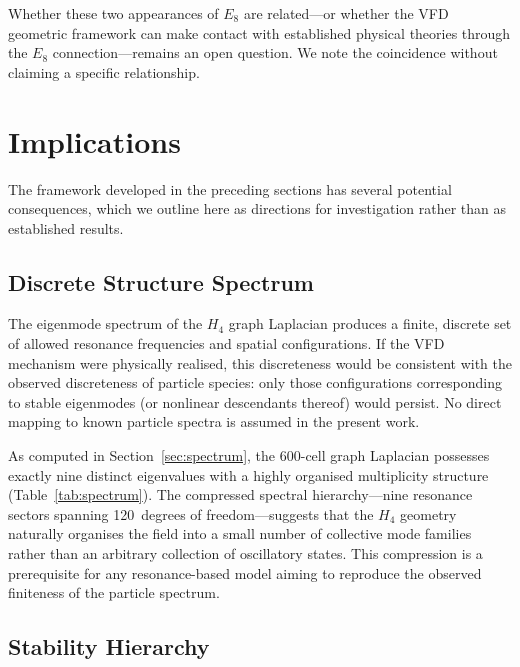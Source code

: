 \documentclass[12pt,a4paper]{article}
\newcommand{\Hfour}{H_4}
\newcommand{\Eeight}{E_8}
\begin{document}
Whether these two appearances of $\Eeight$ are related---or whether the VFD
geometric framework can make contact with established physical theories through
the $\Eeight$ connection---remains an open question.  We note the coincidence
without claiming a specific relationship.


\section{Implications}\label{sec:implications}

The framework developed in the preceding sections has several potential
consequences, which we outline here as directions for investigation rather than
as established results.

\subsection{Discrete Structure Spectrum}

The eigenmode spectrum of the $\Hfour$ graph Laplacian produces a finite,
discrete set of allowed resonance frequencies and spatial configurations.  If the VFD mechanism were physically realised, this discreteness would
be consistent with the observed discreteness of particle species: only
those configurations corresponding to stable eigenmodes (or nonlinear
descendants thereof) would persist.  No direct mapping to known particle
spectra is assumed in the present work.

As computed in Section~\ref{sec:spectrum}, the 600-cell graph Laplacian
possesses exactly nine distinct eigenvalues with a highly organised
multiplicity structure (Table~\ref{tab:spectrum}).  The compressed spectral
hierarchy---nine resonance sectors spanning 120~degrees of freedom---suggests
that the $\Hfour$ geometry naturally organises the field into a small number of
collective mode families rather than an arbitrary collection of oscillatory
states.  This compression is a prerequisite for any resonance-based model
aiming to reproduce the observed finiteness of the particle spectrum.

\subsection{Stability Hierarchy}
\end{document}

